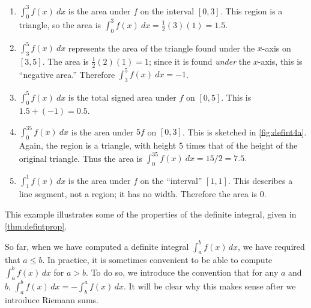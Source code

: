 {\begin{enumerate}
	\item	$ \int_0^3 f(x)\ dx$ is the area under $f$ on the interval $[0,3]$. This region is a triangle, so the area is $\int_0^3 f(x)\ dx=\frac12(3)(1) = 1.5$. 
	\item	$\int_3^5 f(x)\ dx$ represents the area of the triangle found under the $x$-axis on $[3,5]$. The area is $\frac12(2)(1) = 1$; since it is found \textit{under} the $x$-axis, this is ``negative area.'' Therefore $ \int_3^5 f(x)\ dx = -1$.
	\item	$ \int_0^5f(x)\ dx$ is the total signed area under $f$ on $[0,5]$. This is $1.5 + (-1) = 0.5$.
	\item	$ \int_0^35f(x)\ dx$ is the area under $5f$ on $[0,3]$. This is sketched in \autoref{fig:defint4a}. Again, the region is a triangle, with height 5 times that of the height of the original triangle. Thus the area is $ \int_0^35f(x)\ dx = 15/2 = 7.5.$
		
		
	\item	$\int_1^1f(x)\ dx$ is the area under $f$ on the ``interval'' $[1,1]$. This describes a line segment, not a region; it has no width. Therefore the area is 0.\eoehere
\end{enumerate}}

This example illustrates some of the properties of the definite integral, given in \autoref{thm:defintprop}.

So far, when we have computed a definite integral $\int_a^b f(x)\,dx$, we have required that $a\leq b$. In practice, it is sometimes convenient to be able to compute $\int_a^b f(x)\,dx$ for $a>b$. To do so, we introduce the convention that for any $a$ and $b$, $\int_a^b f(x)\,dx=-\int_b^a f(x)\,dx$. It will be clear why this makes sense after we introduce Riemann sums.

